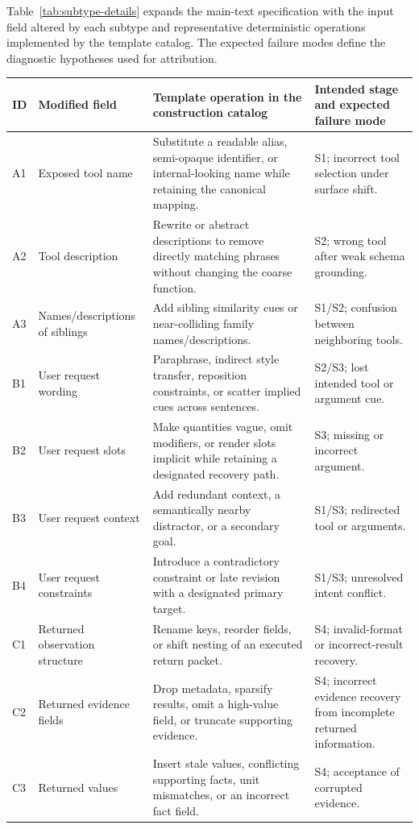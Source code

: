 \documentclass[11pt]{article}
\begin{document}
Table~\ref{tab:subtype-details} expands the main-text specification with the input field altered by each subtype and representative deterministic operations implemented by the template catalog. The expected failure modes define the diagnostic hypotheses used for attribution.

\begin{table}[htbp]
\centering
\scriptsize
\begin{tabularx}{\linewidth}{l l Y Y}
\toprule
ID & Modified field & Template operation in the construction catalog & Intended stage and expected failure mode \\
\midrule
A1 & Exposed tool name & Substitute a readable alias, semi-opaque identifier, or internal-looking name while retaining the canonical mapping. & S1; incorrect tool selection under surface shift. \\
A2 & Tool description & Rewrite or abstract descriptions to remove directly matching phrases without changing the coarse function. & S2; wrong tool after weak schema grounding. \\
A3 & Names/descriptions of siblings & Add sibling similarity cues or near-colliding family names/descriptions. & S1/S2; confusion between neighboring tools. \\
B1 & User request wording & Paraphrase, indirect style transfer, reposition constraints, or scatter implied cues across sentences. & S2/S3; lost intended tool or argument cue. \\
B2 & User request slots & Make quantities vague, omit modifiers, or render slots implicit while retaining a designated recovery path. & S3; missing or incorrect argument. \\
B3 & User request context & Add redundant context, a semantically nearby distractor, or a secondary goal. & S1/S3; redirected tool or arguments. \\
B4 & User request constraints & Introduce a contradictory constraint or late revision with a designated primary target. & S1/S3; unresolved intent conflict. \\
C1 & Returned observation structure & Rename keys, reorder fields, or shift nesting of an executed return packet. & S4; invalid-format or incorrect-result recovery. \\
C2 & Returned evidence fields & Drop metadata, sparsify results, omit a high-value field, or truncate supporting evidence. & S4; incorrect evidence recovery from incomplete returned information. \\
C3 & Returned values & Insert stale values, conflicting supporting facts, unit mismatches, or an incorrect fact field. & S4; acceptance of corrupted evidence. \\

\end{tabularx}
\end{table}
\end{document}
